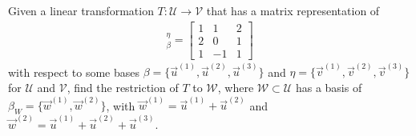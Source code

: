 \begin{exmp}
Given a linear transformation $T: \mathcal{U} \to \mathcal{V}$ that has a matrix representation of
\begin{align*}
[T]_\beta^\eta = 
\begin{bmatrix}
1 & 1 & 2 \\
2 & 0 & 1 \\
1 & -1 & 1
\end{bmatrix}
\end{align*}
with respect to some bases $\mathcal{\beta} = \{\vec{u}^{(1)}, \vec{u}^{(2)}, \vec{u}^{(3)}\}$ and $\mathcal{\eta} = \{\vec{v}^{(1)}, \vec{v}^{(2)}, \vec{v}^{(3)}\}$ for $\mathcal{U}$ and $\mathcal{V}$, find the restriction of $T$ to $\mathcal{W}$, where $\mathcal{W} \subset \mathcal{U}$ has a basis of $\beta_W = \{\vec{w}^{(1)}, \vec{w}^{(2)}\}$, with $\vec{w}^{(1)} = \vec{u}^{(1)} + \vec{u}^{(2)}$ and $\vec{w}^{(2)} = \vec{u}^{(1)} + \vec{u}^{(2)} + \vec{u}^{(3)}$.
\end{exmp}
